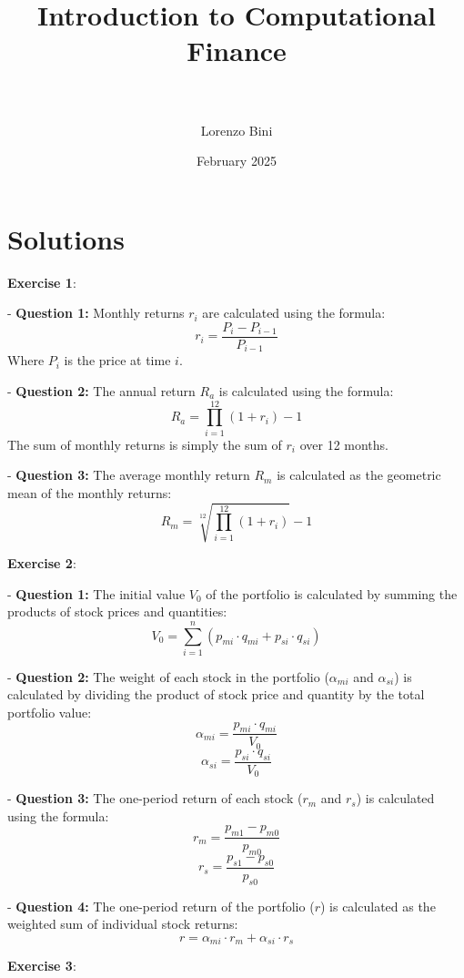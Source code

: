 \documentclass{article}
\begin{document}
\title{\textbf{Introduction to Computational Finance}\\[16pt] \\ }
\author{Lorenzo Bini}
\date{February 2025}
\maketitle

\section{Solutions}

\textbf{Exercise 1}:

- \textbf{Question 1:} Monthly returns \( r_i \) are calculated using the formula:
  \[ r_i = \frac{{P_i - P_{i-1}}}{{P_{i-1}}} \]
  Where \( P_i \) is the price at time \( i \).
  
- \textbf{Question 2:} The annual return \( R_a \) is calculated using the formula:
  \[ R_a = \prod_{i=1}^{12} (1 + r_i) - 1 \]
  The sum of monthly returns is simply the sum of \( r_i \) over 12 months.

- \textbf{Question 3:} The average monthly return \( R_m \) is calculated as the geometric mean of the monthly returns:
  \[ R_m = \sqrt[12]{\prod_{i=1}^{12} (1 + r_i)} - 1 \]

\textbf{Exercise 2}:

- \textbf{Question 1:} The initial value \( V_0 \) of the portfolio is calculated by summing the products of stock prices and quantities:
  \[ V_0 = \sum_{i=1}^{n} (p_{mi} \cdot q_{mi} + p_{si} \cdot q_{si}) \]

- \textbf{Question 2:} The weight of each stock in the portfolio (\( \alpha_{mi} \) and \( \alpha_{si} \)) is calculated by dividing the product of stock price and quantity by the total portfolio value:
  \[ \alpha_{mi} = \frac{{p_{mi} \cdot q_{mi}}}{{V_0}} \]
  \[ \alpha_{si} = \frac{{p_{si} \cdot q_{si}}}{{V_0}} \]

- \textbf{Question 3:} The one-period return of each stock (\( r_m \) and \( r_s \)) is calculated using the formula:
  \[ r_m = \frac{{p_{m1} - p_{m0}}}{{p_{m0}}} \]
  \[ r_s = \frac{{p_{s1} - p_{s0}}}{{p_{s0}}} \]

- \textbf{Question 4:} The one-period return of the portfolio (\( r \)) is calculated as the weighted sum of individual stock returns:
  \[ r = \alpha_{mi} \cdot r_m + \alpha_{si} \cdot r_s \]

\textbf{Exercise 3}:
\end{document}
